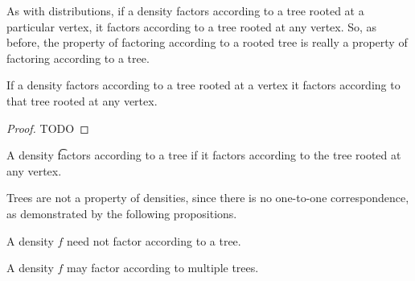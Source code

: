 

As with distributions, if a density factors according to a tree rooted at a particular vertex, it factors according to a tree rooted at any vertex.
So, as before, the property of factoring according to a rooted tree is really a property of factoring according to a tree.



\begin{prop}

If a density factors according to a tree rooted at a vertex it factors according to that tree rooted at any vertex.

\begin{proof}

TODO

\end{proof}

\end{prop}


A density \t{factors according to a tree} if it factors according to the tree rooted at any vertex.


Trees are not a property of densities,
since there is no one-to-one correspondence,
as demonstrated by the following propositions.


\begin{prop}
  A density $f$ need not factor according to a tree.
\end{prop}


\begin{prop}
  A density $f$ may factor according to multiple trees.
\end{prop}
